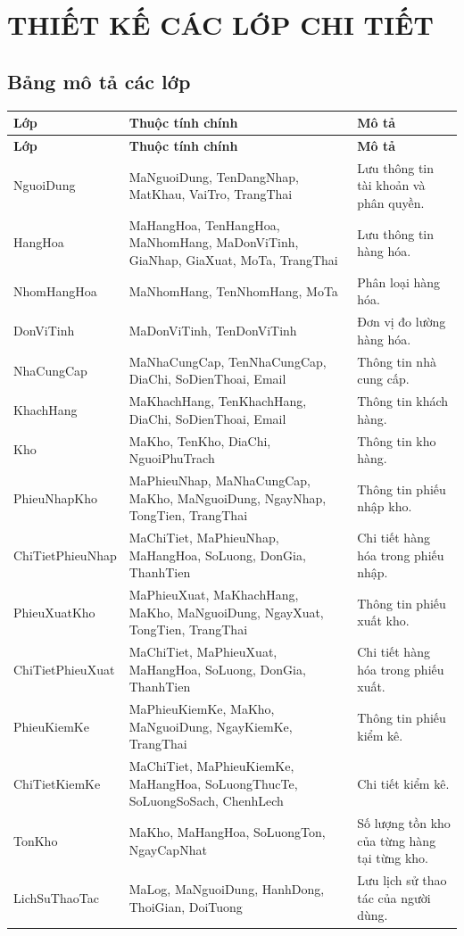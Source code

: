 \chapter{THIẾT KẾ CÁC LỚP CHI TIẾT}

\section{Bảng mô tả các lớp}

\begin{longtable}{|p{3cm}|p{3cm}|p{6.5cm}|}
\hline
\textbf{Lớp} & \textbf{Thuộc tính chính} & \textbf{Mô tả} \\
\hline
\endfirsthead
\hline
\textbf{Lớp} & \textbf{Thuộc tính chính} & \textbf{Mô tả} \\
\hline
\endhead
NguoiDung & MaNguoiDung, TenDangNhap, MatKhau, VaiTro, TrangThai & Lưu thông tin tài khoản và phân quyền. \\
\hline
HangHoa & MaHangHoa, TenHangHoa, MaNhomHang, MaDonViTinh, GiaNhap, GiaXuat, MoTa, TrangThai & Lưu thông tin hàng hóa. \\
\hline
NhomHangHoa & MaNhomHang, TenNhomHang, MoTa & Phân loại hàng hóa. \\
\hline
DonViTinh & MaDonViTinh, TenDonViTinh & Đơn vị đo lường hàng hóa. \\
\hline
NhaCungCap & MaNhaCungCap, TenNhaCungCap, DiaChi, SoDienThoai, Email & Thông tin nhà cung cấp. \\
\hline
KhachHang & MaKhachHang, TenKhachHang, DiaChi, SoDienThoai, Email & Thông tin khách hàng. \\
\hline
Kho & MaKho, TenKho, DiaChi, NguoiPhuTrach & Thông tin kho hàng. \\
\hline
PhieuNhapKho & MaPhieuNhap, MaNhaCungCap, MaKho, MaNguoiDung, NgayNhap, TongTien, TrangThai & Thông tin phiếu nhập kho. \\
\hline
ChiTietPhieuNhap & MaChiTiet, MaPhieuNhap, MaHangHoa, SoLuong, DonGia, ThanhTien & Chi tiết hàng hóa trong phiếu nhập. \\
\hline
PhieuXuatKho & MaPhieuXuat, MaKhachHang, MaKho, MaNguoiDung, NgayXuat, TongTien, TrangThai & Thông tin phiếu xuất kho. \\
\hline
ChiTietPhieuXuat & MaChiTiet, MaPhieuXuat, MaHangHoa, SoLuong, DonGia, ThanhTien & Chi tiết hàng hóa trong phiếu xuất. \\
\hline
PhieuKiemKe & MaPhieuKiemKe, MaKho, MaNguoiDung, NgayKiemKe, TrangThai & Thông tin phiếu kiểm kê. \\
\hline
ChiTietKiemKe & MaChiTiet, MaPhieuKiemKe, MaHangHoa, SoLuongThucTe, SoLuongSoSach, ChenhLech & Chi tiết kiểm kê. \\
\hline
TonKho & MaKho, MaHangHoa, SoLuongTon, NgayCapNhat & Số lượng tồn kho của từng hàng tại từng kho. \\
\hline
LichSuThaoTac & MaLog, MaNguoiDung, HanhDong, ThoiGian, DoiTuong & Lưu lịch sử thao tác của người dùng. \\
\hline
\end{longtable}

